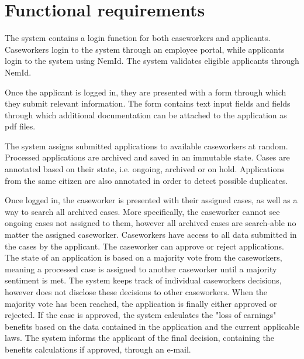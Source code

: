 \newpage
\section{Functional requirements}

The system contains a login function for both caseworkers and applicants. Caseworkers login to the system through an employee portal, while applicants login to the system using NemId. The system validates eligible applicants through NemId.

\vspace{2mm}

Once the applicant is logged in, they are presented with a form through which they submit relevant information. The form contains text input fields and fields through which additional documentation can be attached to the application as pdf files.

\vspace{2mm}

The system assigns submitted applications to available caseworkers at random. Processed applications are archived and saved in an immutable state. Cases are annotated based on their state, i.e. ongoing, archived or on hold. Applications from the same citizen are also annotated in order to detect possible duplicates.

\vspace{2mm}

Once logged in, the caseworker is presented with their assigned cases, as well as a way to search all archived cases. More specifically, the caseworker cannot see ongoing cases not assigned to them, however all archived cases are search-able no matter the assigned caseworker. Caseworkers have access to all data submitted in the cases by the applicant. The caseworker can approve or reject applications. The state of an application is based on a majority vote from the caseworkers, meaning a processed case is assigned to another caseworker until a majority sentiment is met. The system keeps track of individual caseworkers decisions, however does not disclose these decisions to other caseworkers. When the majority vote has been reached, the application is finally either approved or rejected. If the case is approved, the system calculates the "loss of earnings" benefits based on the data contained in the application and the current applicable laws. The system informs the applicant of the final decision, containing the benefits calculations if approved, through an e-mail.

\vspace{2mm}

